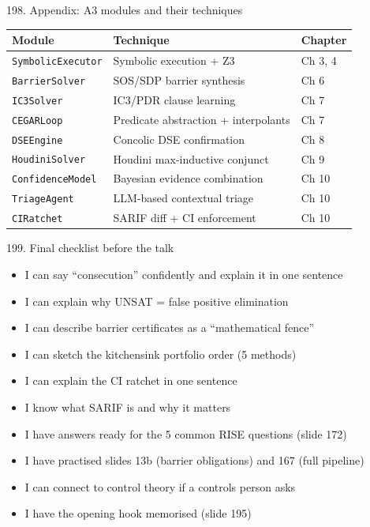 \documentclass[aspectratio=169]{beamer}
\begin{document}
\begin{frame}{198. Appendix: A3 modules and their techniques}
\begin{center}
\begin{tabular}{lll}
\textbf{Module} & \textbf{Technique} & \textbf{Chapter} \\ \hline
\texttt{SymbolicExecutor} & Symbolic execution + Z3 & Ch 3, 4 \\
\texttt{BarrierSolver} & SOS/SDP barrier synthesis & Ch 6 \\
\texttt{IC3Solver} & IC3/PDR clause learning & Ch 7 \\
\texttt{CEGARLoop} & Predicate abstraction + interpolants & Ch 7 \\
\texttt{DSEEngine} & Concolic DSE confirmation & Ch 8 \\
\texttt{HoudiniSolver} & Houdini max-inductive conjunct & Ch 9 \\
\texttt{ConfidenceModel} & Bayesian evidence combination & Ch 10 \\
\texttt{TriageAgent} & LLM-based contextual triage & Ch 10 \\
\texttt{CIRatchet} & SARIF diff + CI enforcement & Ch 10 \\
\end{tabular}
\end{center}
\end{frame}

\begin{frame}{199. Final checklist before the talk}
\begin{itemize}
  \item[$\square$] I can say ``consecution'' confidently and explain it in one sentence
  \item[$\square$] I can explain why UNSAT = false positive elimination
  \item[$\square$] I can describe barrier certificates as a ``mathematical fence''
  \item[$\square$] I can sketch the kitchensink portfolio order (5 methods)
  \item[$\square$] I can explain the CI ratchet in one sentence
  \item[$\square$] I know what SARIF is and why it matters
  \item[$\square$] I have answers ready for the 5 common RISE questions (slide 172)
  \item[$\square$] I have practised slides 13b (barrier obligations) and 167 (full pipeline)
  \item[$\square$] I can connect to control theory if a controls person asks
  \item[$\square$] I have the opening hook memorised (slide 195)
\end{itemize}
\end{frame}
\end{document}
